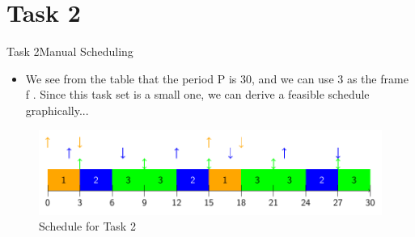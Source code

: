 
\section{Task 2}

\setcounter{task}{1}

\begin{frame}{Task 2}{Manual Scheduling\vspace{0.5cm}}
  \begin{itemize}
    \item We see from the table that the period P is 30, and we can use 3 as the frame f . Since this task set is a small one, we can derive a feasible schedule graphically...
  \end{itemize}
  \begin{figure}
    \includegraphics[width=0.7\paperwidth]{./figures/task2_schedule.png}
    \caption{Schedule for Task 2}
  \end{figure}
\end{frame}
